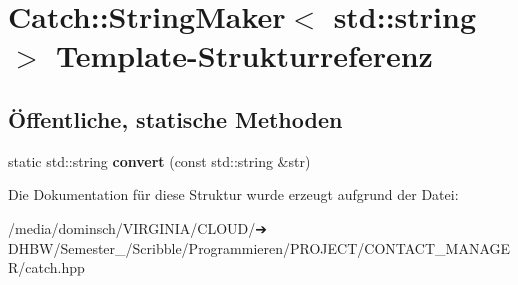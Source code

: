 \hypertarget{structCatch_1_1StringMaker_3_01std_1_1string_01_4}{}\section{Catch\+:\+:String\+Maker$<$ std\+:\+:string $>$ Template-\/\+Strukturreferenz}
\label{structCatch_1_1StringMaker_3_01std_1_1string_01_4}
\subsection*{Öffentliche, statische Methoden}
\begin{DoxyCompactItemize}
\item 
\mbox{\label{structCatch_1_1StringMaker_3_01std_1_1string_01_4_ae065b2ecc5c1a6c4409cf06d604bd66d}} 
static std\+::string {\bfseries convert} (const std\+::string \&str)
\end{DoxyCompactItemize}


Die Dokumentation für diese Struktur wurde erzeugt aufgrund der Datei\+:\begin{DoxyCompactItemize}
\item 
/media/dominsch/\+V\+I\+R\+G\+I\+N\+I\+A/\+C\+L\+O\+U\+D/➔ D\+H\+B\+W/\+Semester\+\_/\+Scribble/\+Programmieren/\+P\+R\+O\+J\+E\+C\+T/\+C\+O\+N\+T\+A\+C\+T\+\_\+\+M\+A\+N\+A\+G\+E\+R/catch.\+hpp\end{DoxyCompactItemize}
